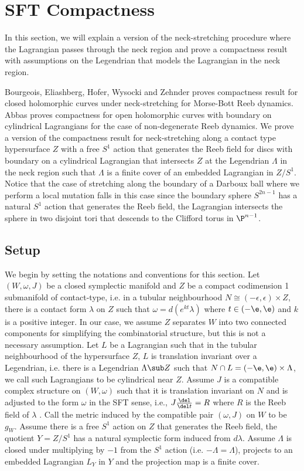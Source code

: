 
\section{SFT Compactness} \label{sec:SFT}


In this section, we will explain a version of the neck-stretching procedure where the Lagrangian passes through the neck region and prove a compactness result with assumptions on the Legendrian that models the Lagrangian in the neck region.

Bourgeois, Eliashberg, Hofer, Wysocki and Zehnder \cite{bhewz} proves compactness result for closed holomorphic curves under neck-stretching for Morse-Bott Reeb dynamics. Abbas \cite{Abbasbook} proves compactness for open holomorphic curves with boundary on cylindrical Lagrangians  for the case of non-degenerate Reeb dynamics. We prove a version of the compactness result for neck-stretching along a contact type hypersurface $Z$ with a  free $S^1$ action that generates the Reeb field  for discs with boundary on a cylindrical Lagrangian that intersects $Z$ at the Legendrian $\Lambda$ in the neck region such that $\Lambda$ is a finite cover of an embedded Lagrangian in $Z/S^1$. Notice that the case of stretching along the boundary of a Darboux ball where we perform a local mutation falls in this case since the boundary sphere $S^{2n-1}$ has a natural $S^1$ action that generates the Reeb field, the Lagrangian intersects the sphere in two disjoint tori that descends to the Clifford torus in $\P^{n-1}$.




\subsection{Setup}\label{subsec:sftsetup}
We begin by setting the notations and conventions for this section. Let $(W,\omega,J)$ be a closed symplectic manifold and $Z$ be a compact codimension 1 submanifold of contact-type, i.e. in a tubular neighbourhood  $N \cong (-\epsilon,\epsilon) \times Z$, there is a contact form $\lambda$ on $Z$ such that  $\omega = d(e^{kt}\lambda)$ where $t\in(-\e,\e)$ and $k$ is a positive integer. In our case, we assume $Z$ separates $W$ into two connected components for simplifying the combinatorial structure, but this is not a necessary assumption. Let $L$ be a Lagrangian such that in the tubular neighbourhood of the hypersurface $Z$, $L$ is translation invariant over a Legendrian, i.e. there is a Legendrian $\Lambda \sub Z$ such that $N \cap L = (-\e,\e) \times \Lambda$, we call such Lagrangians to be cylindrical near $Z$. Assume $J$ is a compatible complex structure on $(W,\omega)$ such that it is translation invariant on $N$ and is adjusted to the form $\omega$ in the SFT sense, i.e., $J\frac{\del}{\del t} = R$ where $R$ is the Reeb field of $\lambda$ . Call the metric induced by the compatible pair $(\omega,J)$ on $W$ to be $g_W.$ Assume there is a free $S^1$ action on $Z$ that generates the Reeb field, the quotient $Y=Z/S^1$ has a natural symplectic form induced from $d\lambda$. Assume $\Lambda$ is closed under multiplying by $-1$ from the $S^1$ action (i.e. $-\Lambda = \Lambda$), projects to an embedded Lagrangian $L_Y$ in $Y$ and the projection map is a finite cover.


